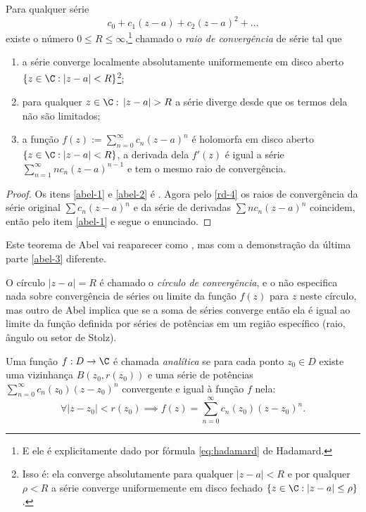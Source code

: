\begin{teorema}[Abel]
\label{t:abel}
Para qualquer série
\[ c_0 + c_1 (z-a) + c_2 (z-a)^2 + \dots \]
existe o número $0\leq R \leq \infty$,\footnote{
E ele é explicitamente dado por fórmula \eqref{eq:hadamard} de Hadamard.}
chamado o \emph{raio de convergência} de série tal que
\begin{enumerate}
\item \label{abel-1} a série converge localmente absolutamente uniformemente 
em disco aberto $\{z\in \C : |z-a|<R\}$\footnote{Isso é:
ela converge absolutamente para qualquer $|z-a|<R$
e por qualquer $\rho < R$ a série converge uniformemente em disco fechado
$\{z\in\C : |z-a| \leq \rho \}$.};
\item \label{abel-2} para qualquer $z\in\C :\, |z-a| > R$ a série diverge desde que os termos dela não são limitados;
\item \label{abel-3} a função $f(z) := \sum_{n=0}^\infty c_n (z-a)^n$
é holomorfa em disco aberto $\{z\in \C : |z-a| < R\}$,
a derivada dela $f'(z)$ é igual a série $\sum_{n=1}^\infty n c_n (z-a)^{n-1}$
e tem o mesmo raio de convergência.
\end{enumerate}
\end{teorema}
\begin{proof}
Os itens \eqref{abel-1} e \eqref{abel-2} é .
Agora pelo \eqref{rd-4} os raios de convergência
da série original $\sum  c_n (z-a)^n$ e da série de derivadas $\sum n c_n (z-a)^n$ coincidem,
então pelo item \eqref{abel-1} e  segue o enunciado.
\end{proof}
Este teorema de Abel vai reaparecer como ,
mas com a demonstração da última parte \eqref{abel-3} diferente.

O círculo $|z-a| = R$ é chamado o \emph{círculo de convergência}, e o  não especifica
nada sobre convergência de séries ou limite da função $f(z)$ para $z$ neste círculo,
mas outro  de Abel implica que se a soma de séries converge
então ela é igual ao limite da função definida por séries de potências
em um região específico (raio, ângulo ou setor de Stolz).

\begin{defin}
Uma função $f: D\to \C$ é chamada \emph{analítica}
se para cada ponto $z_0\in D$ existe
uma vizinhança $B(z_0,r(z_0))$
e uma série de potências $\sum_{n=0}^\infty c_n(z_0) (z-z_0)^n$
convergente e igual à função $f$ nela:
\[\forall |z-z_0|<r(z_0) \implies f(z) = \sum_{n=0}^\infty c_n(z_0) (z-z_0)^n .\]
\end{defin}

